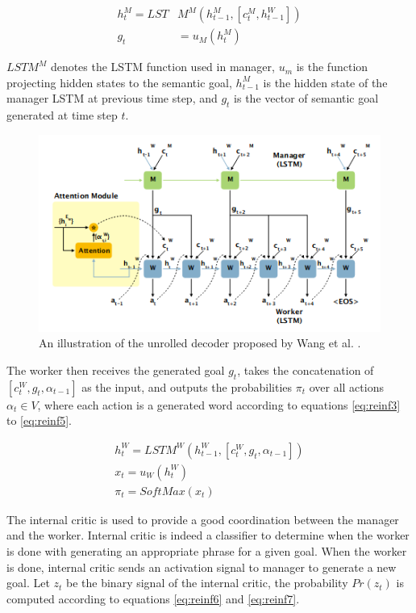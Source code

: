 \documentclass[preprint, 12pt]{elsarticle}
\begin{document}
		\begin{align}
			h_t^M = LST&M^M(h_{t-1}^M, [c_t^M, h_{t-1}^W]) \label{eq:reinf1} \\
			g_t &= u_M(h_t^M) \label{eq:reinf2}
		\end{align}
		
		$LSTM^M$ denotes the LSTM function used in manager, $u_m$ is the function projecting hidden states to the semantic goal, $h_{t-1}^M$ is the hidden state of the manager LSTM at previous time step, and $g_t$ is the vector of semantic goal generated at time step $t$.
		
		\begin{figure}[H]
		\centering
		\includegraphics[scale=0.8]{Imgs/reinf2.png}
		\caption{An illustration of the unrolled decoder proposed by Wang et al. \cite{wang2018video}.}
		\label{fig:reinf2}
	\end{figure}
	
		The worker then receives the generated goal $g_t$, takes the concatenation of $[c_t^W, g_t, \alpha_{t-1}]$ as the input, and outputs the probabilities $\pi_t$ over all actions $\alpha_t \in V$, where each action is a generated word according to equations \eqref{eq:reinf3} to \eqref{eq:reinf5}.
		
		\begin{align}
			h_t^W = LSTM^W(h_{t-1}^W, [c_t^W, g_t, \alpha_{t-1}]) \label{eq:reinf3} \\
			x_t = u_W(h_t^W) \label{eq:reinf4} \\
			\pi_t = SoftMax(x_t) \label{eq:reinf5} 
		\end{align}
		
		The internal critic is used to provide a good coordination between the manager and the worker. Internal critic is indeed a classifier to determine when the worker is done with generating an appropriate phrase for a given goal. When the worker is done, internal critic sends an activation signal to manager to generate a new goal. Let $z_t$ be the binary signal of the internal critic, the probability $Pr(z_t)$ is computed according to equations \eqref{eq:reinf6} and \eqref{eq:reinf7}.
		
\end{document}

